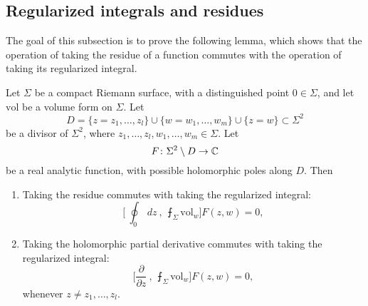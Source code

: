 \subsection{Regularized integrals and residues}

The goal of this subsection is to prove the following lemma,
which shows that the operation of taking the residue of a function
commutes with the operation of taking its regularized integral.

\begin{lemma}
    \label{lem-commutator}
    Let $\Sigma$ be a compact Riemann surface,
    with a distinguished point $0 \in \Sigma$,
    and let $\mathrm{vol}$ be a volume form on $\Sigma$.
    Let
    \[
        D =
        \{ z = z_1, \dotsc, z_l \} \cup
        \{ w = w_1, \dotsc, w_m \} \cup
        \{ z = w \}
        \subset \Sigma^2
    \]
    be a divisor of $\Sigma^2$,
    where $z_1, \dotsc, z_l, w_1, \dotsc, w_m \in \Sigma$.
    Let
    \[
        F \colon \Sigma^2 \setminus D \to \mathbb{C}
    \]
    be a real analytic function,
    with possible holomorphic poles along $D$.
    Then
    \begin{enumerate} [label={\textup{(\roman*)}}]
        \item
            Taking the residue commutes with
            taking the regularized integral:
            \[
                \Biggl[ \ 
                    \oint_0 \ d z \ , \ 
                    \intbar_\Sigma \mathrm{vol}_w
                \Biggr]
                F (z, w)
                = 0,
            \]
        \item 
            Taking the holomorphic partial derivative commutes with
            taking the regularized integral:
            \[
                \Biggl[ 
                    \frac {\partial} {\partial z} \ , \ 
                    \intbar_\Sigma \mathrm{vol}_w
                \Biggr]
                F (z, w)
                = 0,
            \]
            whenever $z \neq z_1, \dotsc, z_l$.
    \end{enumerate}
\end{lemma}

